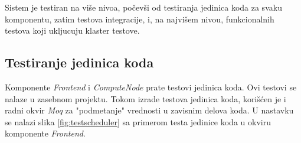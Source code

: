 \documentclass[12pt,oneside]{memoir}
\begin{document}


Sistem je testiran na više nivoa, počevši od testiranja jedinica koda za svaku komponentu, zatim testova integracije, i, na najvišem nivou, funkcionalnih testova koji ukljucuju klaster testove.

\subsection{Testiranje jedinica koda}
Komponente \emph{Frontend} i \emph{ComputeNode} prate testovi jedinica koda. Ovi testovi se nalaze u zasebnom projektu. Tokom izrade testova jedinica koda, korišćen je i radni okvir \emph{Moq} \cite{Moq} za "podmetanje" vrednosti u zavisnim delova koda. U nastavku se nalazi slika \ref{fig:testscheduler} sa primerom testa jedinice koda u okviru komponente \emph{Frontend}.
\end{document}
